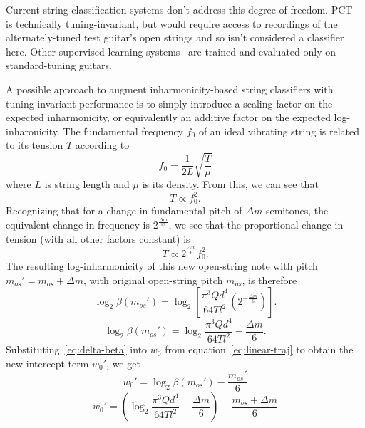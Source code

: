 \documentclass[12pt]{cmuthesis}
\begin{document}
Current string classification systems don't address this degree of freedom. PCT~\cite{barbanchoi2012} is technically tuning-invariant, but would require access to recordings of the alternately-tuned test guitar's open strings and so isn't considered a classifier here. Other supervised learning systems~\cite{kehling2014, dittmar2013, abesser2012} are trained and evaluated only on standard-tuning guitars.

A possible approach to augment inharmonicity-based string classifiers with tuning-invariant performance is to simply introduce a scaling factor on the expected inharmonicity, or equivalently an additive factor on the expected log-inharonicity. The fundamental frequency $f_0$ of an ideal vibrating string is related to its tension $T$ according to
\begin{equation}
f_0 = \frac{1}{2L}\sqrt{\frac{T}{\mu}}
\end{equation}
where $L$ is string length and $\mu$ is its density. From this, we can see that
\begin{equation}
T \propto f_0^{2}.
\end{equation}
Recognizing that for a change in fundamental pitch of $\Delta m$ semitones, the equivalent change in frequency is $2^{\frac{\Delta m}{12}}$, we see that the proportional change in tension (with all other factors constant) is
\begin{equation}
T \propto 2^{\frac{\Delta m}{6}}f_0^2.
\end{equation}
The resulting log-inharmonicity of this new open-string note with pitch $m_{os}' = m_{os}+\Delta m$, with original open-string pitch $m_{os}$, is therefore
\begin{equation}
\log_2\beta(m_{os}') = \log_2[ \frac{\pi^3 Q d^4}{64 T l^2}(2^{-\frac{\Delta m}{6}})].
\end{equation}
\begin{equation}
\label{eq:delta-beta}
\log_2\beta(m_{os}') = \log_2\frac{\pi^3 Q d^4}{64 T l^2} - \frac{\Delta m}{6}.
\end{equation}
Substituting~\eqref{eq:delta-beta} into $w_0$ from equation~\eqref{eq:linear-traj} to obtain the new intercept term $w_0'$, we get
\begin{equation}
w_{0}' = \log_2{\beta}(m_{os}') - \frac{m_{os}'}{6}
\end{equation}
\begin{equation}
w_{0}' = (\log_2\frac{\pi^3 Q d^4}{64 T l^2} - \frac{\Delta m}{6}) - \frac{m_{os}+\Delta m}{6}
\end{equation}
\end{document}
